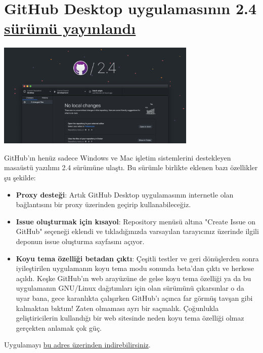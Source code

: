 \documentclass[11pt]{article}
\begin{document}
\section{GitHub Desktop uygulamasının 2.4 \href{https://github.blog/2020-03-25-github-desktop-2-4-introduces-proxy-support-and-issue-creation/}{sürümü yayınlandı}}
\label{sec:org3ded677}
\begin{center}
\includegraphics[height=5cm]{gorseller/github-desktop-2.4.png}
\end{center}

GitHub'ın henüz sadece Windows ve Mac işletim sistemlerini destekleyen
masaüstü yazılımı 2.4 sürümüne ulaştı. Bu sürümle birlikte eklenen bazı
özellikler şu şekilde:

\begin{itemize}
\item \textbf{Proxy desteği}: Artık GitHub Desktop uygulamasının internetle olan
bağlantısını bir proxy üzerinden geçirip kullanabileceğiz.
\item \textbf{Issue oluşturmak için kısayol}: Repository menüsü altına "Create Issue on
GitHub" seçeneği eklendi ve tıkladığınızda varsayılan tarayıcınız üzerinde
ilgili deponun issue oluşturma sayfasını açıyor.
\item \textbf{Koyu tema özelliği betadan çıktı}: Çeşitli testler ve geri dönüşlerden
sonra iyileştirilen uygulamanın koyu tema modu sonunda beta'dan çıktı ve
herkese açıldı. Keşke GitHub'ın web arayüzüne de gelse koyu tema özelliği
ya da bu uygulamanın GNU/Linux dağıtımları için olan sürümünü çıkarsınlar o
da uyar bana, gece karanlıkta çalışırken GitHub'ı açınca far görmüş tavşan
gibi kalmaktan bıktım! Zaten olmaması ayrı bir saçmalık. Çoğunlukla
geliştiricilerin kullandığı bir web sitesinde neden koyu tema özelliği
olmaz gerçekten anlamak çok güç.
\end{itemize}

Uygulamayı \href{https://desktop.github.com/}{bu adres üzerinden indirebilirsiniz}.
\end{document}
